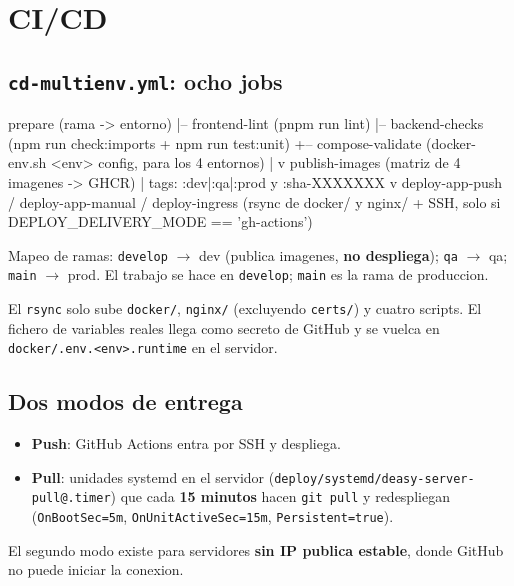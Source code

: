 \documentclass[11pt,a4paper,oneside]{report}
\newcommand{\rt}[1]{\texttt{#1}}
\begin{document}
\section{CI/CD}

\subsection{\rt{cd-multienv.yml}: ocho jobs}

\begin{diagrama}
prepare (rama -> entorno)
   |-- frontend-lint        (pnpm run lint)
   |-- backend-checks       (npm run check:imports + npm run test:unit)
   +-- compose-validate     (docker-env.sh <env> config, para los 4 entornos)
              |
              v
        publish-images      (matriz de 4 imagenes -> GHCR)
              |             tags: :dev|:qa|:prod  y  :sha-XXXXXXX
              v
        deploy-app-push / deploy-app-manual / deploy-ingress
              (rsync de docker/ y nginx/ + SSH, solo si DEPLOY_DELIVERY_MODE == 'gh-actions')
\end{diagrama}

Mapeo de ramas: \rt{develop} $\rightarrow$ dev (publica imagenes, \textbf{no despliega});
\rt{qa} $\rightarrow$ qa; \rt{main} $\rightarrow$ prod. El trabajo se hace en \rt{develop};
\rt{main} es la rama de produccion.

El \rt{rsync} solo sube \rt{docker/}, \rt{nginx/} (excluyendo \rt{certs/}) y cuatro scripts. El
fichero de variables reales llega como secreto de GitHub y se vuelca en
\rt{docker/.env.<env>.runtime} en el servidor.

\subsection{Dos modos de entrega}

\begin{itemize}[leftmargin=1.4em]
  \item \textbf{Push}: GitHub Actions entra por SSH y despliega.
  \item \textbf{Pull}: unidades systemd en el servidor
        (\rt{deploy/systemd/deasy-server-pull@.timer}) que cada \textbf{15 minutos} hacen
        \rt{git pull} y redespliegan (\rt{OnBootSec=5m}, \rt{OnUnitActiveSec=15m},
        \rt{Persistent=true}).
\end{itemize}

El segundo modo existe para servidores \textbf{sin IP publica estable}, donde GitHub no puede
iniciar la conexion.
\end{document}
